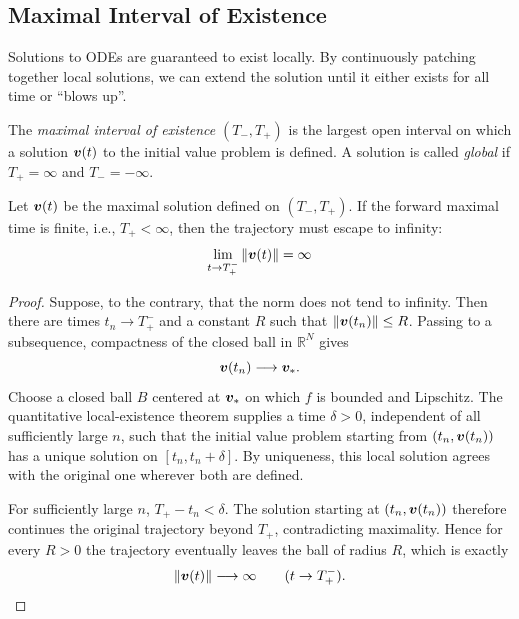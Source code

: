 \subsection{Maximal Interval of Existence}

Solutions to ODEs are guaranteed to exist locally. By continuously patching together local solutions, we can extend the solution until it either exists for all time or ``blows up''.

\begin{definition}
The \textit{maximal interval of existence} $(T_-, T_+)$ is the largest open interval on which a solution $\bm{v}(t)$ to the initial value problem is defined. A solution is called \textit{global} if $T_+ = \infty$ and $T_- = -\infty$.
\end{definition}

\begin{theorem}
Let $\bm{v}(t)$ be the maximal solution defined on $(T_-, T_+)$. If the forward maximal time is finite, i.e., $T_+ < \infty$, then the trajectory must escape to infinity:
\begin{equation}
\lim_{t \to T_+^-} \|\bm{v}(t)\| = \infty
\end{equation}

\end{theorem}

\begin{proof}
Suppose, to the contrary, that the norm does not tend to infinity.
Then there are times $t_n\to T_+^-$ and a constant $R$ such that
$\|\bm{v}(t_n)\|\leq R$. Passing to a subsequence, compactness of the closed
ball in $\mathbb{R}^N$ gives
\[
\bm{v}(t_n)\longrightarrow\bm{v}_*.
\]
Choose a closed ball $B$ centered at $\bm{v}_*$ on which $f$ is bounded and
Lipschitz. The quantitative local-existence theorem supplies a time
$\delta>0$, independent of all sufficiently large $n$, such that the
initial value problem starting from $(t_n,\bm{v}(t_n))$ has a unique solution
on $[t_n,t_n+\delta]$. By uniqueness, this local solution agrees with the
original one wherever both are defined.

For sufficiently large $n$, $T_+-t_n<\delta$. The solution starting at
$(t_n,\bm{v}(t_n))$ therefore continues the original trajectory beyond
$T_+$, contradicting maximality. Hence for every $R>0$ the trajectory
eventually leaves the ball of radius $R$, which is exactly
\[
\|\bm{v}(t)\|\longrightarrow\infty
\qquad (t\to T_+^-).
\]
\end{proof}

